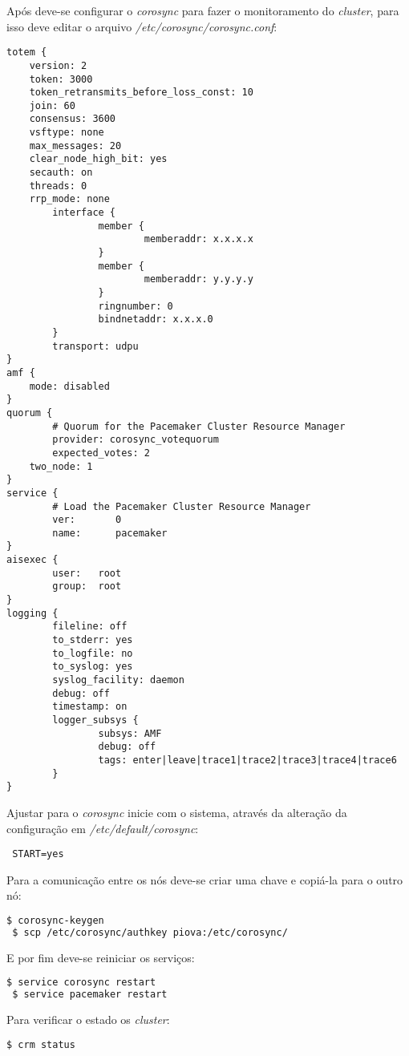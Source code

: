 Após deve-se configurar o \textit{corosync} para fazer o monitoramento do \textit{cluster}, para isso deve editar o arquivo 
\textit{/etc/corosync/corosync.conf}:
\begin{lstlisting}
totem {
	version: 2
	token: 3000
	token_retransmits_before_loss_const: 10
	join: 60
	consensus: 3600
	vsftype: none
	max_messages: 20
	clear_node_high_bit: yes
 	secauth: on
 	threads: 0
 	rrp_mode: none
        interface {
                member {
                        memberaddr: x.x.x.x
                }
                member {
                        memberaddr: y.y.y.y
                }
                ringnumber: 0
                bindnetaddr: x.x.x.0
        }
        transport: udpu
}
amf {
	mode: disabled
}
quorum {
        # Quorum for the Pacemaker Cluster Resource Manager
        provider: corosync_votequorum
        expected_votes: 2
	two_node: 1
}
service {
        # Load the Pacemaker Cluster Resource Manager
        ver:       0
        name:      pacemaker
}
aisexec {
        user:   root
        group:  root
}
logging {
        fileline: off
        to_stderr: yes
        to_logfile: no
        to_syslog: yes
        syslog_facility: daemon
        debug: off
        timestamp: on
        logger_subsys {
                subsys: AMF
                debug: off
                tags: enter|leave|trace1|trace2|trace3|trace4|trace6
        }
}
\end{lstlisting}

Ajustar para o \textit{corosync} inicie com o sistema, através da alteração da configuração em \textit{/etc/default/corosync}:
\begin{lstlisting}
 START=yes
\end{lstlisting}

Para a comunicação entre os nós deve-se criar uma chave e copiá-la para o outro nó:
\begin{lstlisting}[language=bash]
 $ corosync-keygen
 $ scp /etc/corosync/authkey piova:/etc/corosync/
\end{lstlisting}

E por fim deve-se reiniciar os serviços:
\begin{lstlisting}[language=bash]
 $ service corosync restart
 $ service pacemaker restart
\end{lstlisting}

Para verificar o estado os \textit{cluster}:
\begin{lstlisting}[language=bash]
 $ crm status
\end{lstlisting}

